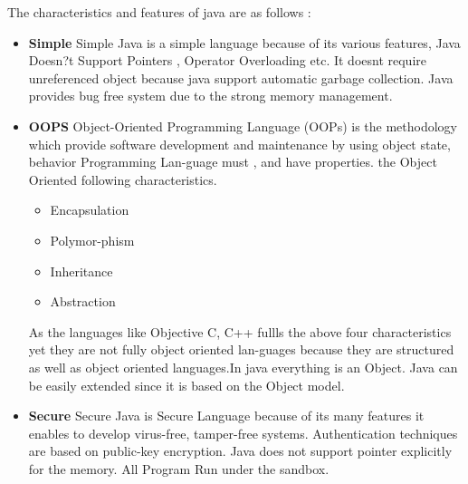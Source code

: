 The characteristics and features of java are as follows :

\begin{itemize}
	\item \textbf{Simple}
Simple Java is a simple language because of its various features, Java
Doesn?t Support Pointers , Operator Overloading etc. It doesnt require
unreferenced object because java support automatic garbage collection.
Java provides bug free system due to the strong memory management.

\item \textbf{OOPS}
Object-Oriented Programming Language (OOPs) is the
methodology which provide software development and maintenance by
using
object
state,
behavior
Programming Lan-guage
must
,
and
have
properties.
the
Object Oriented following characteristics.
\begin{itemize}
	\item Encapsulation
\item Polymor-phism
 \item Inheritance
\item Abstraction

\end{itemize}
As the languages like Objective C, C++ fullls the above four characteristics yet
they are not fully object oriented lan-guages because they are structured
as well as object oriented languages.In java everything is an Object. Java
can be easily extended since it is based on the Object model.
\item \textbf{Secure}
Secure Java is Secure Language because of its many features it enables to
develop virus-free, tamper-free systems. Authentication techniques are
based on public-key encryption. Java does not support pointer explicitly for
the memory. All Program Run under the sandbox.


\end{itemize}
